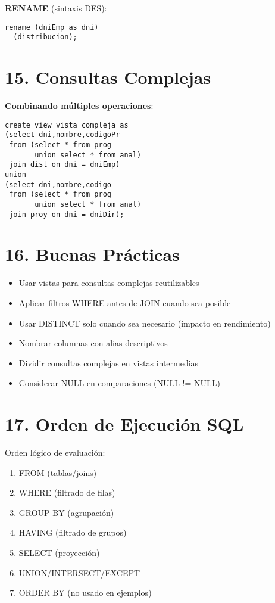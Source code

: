 \documentclass[10pt,a4paper,twocolumn]{article}
\begin{document}
\textbf{RENAME} (sintaxis DES):
\begin{lstlisting}
rename (dniEmp as dni)
  (distribucion);
\end{lstlisting}

\section*{15. Consultas Complejas}

\textbf{Combinando múltiples operaciones}:
\begin{lstlisting}
create view vista_compleja as
(select dni,nombre,codigoPr 
 from (select * from prog 
       union select * from anal)
 join dist on dni = dniEmp)
union
(select dni,nombre,codigo 
 from (select * from prog 
       union select * from anal)
 join proy on dni = dniDir);
\end{lstlisting}

\section*{16. Buenas Prácticas}

\begin{itemize}
\item Usar vistas para consultas complejas reutilizables
\item Aplicar filtros WHERE antes de JOIN cuando sea posible
\item Usar DISTINCT solo cuando sea necesario (impacto en rendimiento)
\item Nombrar columnas con alias descriptivos
\item Dividir consultas complejas en vistas intermedias
\item Considerar NULL en comparaciones (NULL != NULL)
\end{itemize}

\section*{17. Orden de Ejecución SQL}

Orden lógico de evaluación:
\begin{enumerate}[noitemsep]
\item FROM (tablas/joins)
\item WHERE (filtrado de filas)
\item GROUP BY (agrupación)
\item HAVING (filtrado de grupos)
\item SELECT (proyección)
\item UNION/INTERSECT/EXCEPT
\item ORDER BY (no usado en ejemplos)
\end{enumerate}
\end{document}
